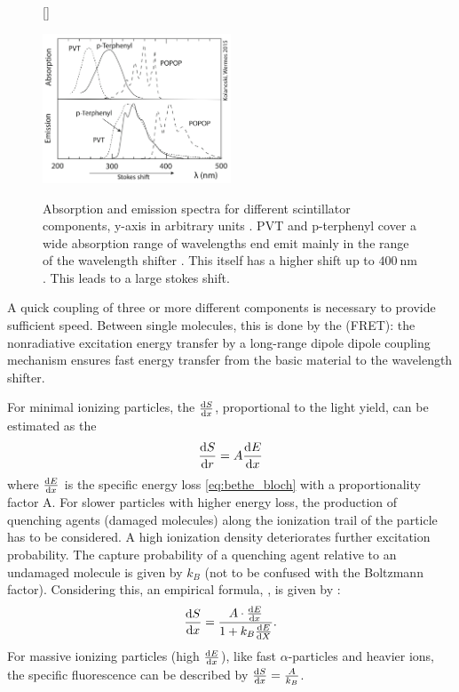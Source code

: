\begin{figure}[t]
	[\FBwidth]
	{\caption[Absorption and emission of scintillator materials]{Absorption and emission spectra for different scintillator components, y-axis in arbitrary units \cite{wermes}.  PVT and p-terphenyl cover a wide absorption range of wavelengths end emit mainly in the range of the wavelength shifter . This itself has a higher shift up to $\SI{400}{\nano\meter}$. This leads to a large stokes shift.}   
		\label{fig:ch2:stokes2}}
	{\includegraphics[width=0.5\textwidth]{./graphics/ch2/stokes2.png}}
\end{figure}
A quick coupling of three or more different components is necessary to provide sufficient speed. Between single molecules, this is done by the  (FRET): the nonradiative excitation energy transfer by a long-range dipole dipole coupling mechanism \cite{FRET} ensures fast energy transfer from the basic material to the wavelength shifter. \par 
For minimal ionizing particles, the  $\dv{S}{x}$, proportional to the light yield, can be estimated as the  \cite{wermes}
\begin{align}
\dv{S}{r}=A\dv{E}{x}
\end{align}   
where $\dv{E}{x}$ is the specific energy loss \eqref{eq:bethe_bloch} with a proportionality factor A. For slower particles with higher energy loss, the production of quenching agents (damaged molecules) along the ionization trail of the particle has to be considered. A high ionization density deteriorates further excitation probability. The capture probability of a quenching agent relative to an undamaged molecule is given by $k_B$ (not to be confused with the Boltzmann factor). Considering this, an empirical formula, , is given by \cite{birks}:
\begin{align}
\dv{S}{x}=\frac{A\cdot\dv{E}{x}}{1+k_B\dv{E}{X}}.
\end{align}     
For massive ionizing particles (high $\dv{E}{x}$), like fast $\alpha$-particles and heavier ions, the specific fluorescence can be described by $\dv{S}{x}=\frac{A}{k_B}$. 


